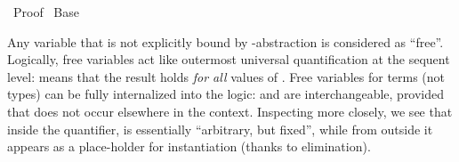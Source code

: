 %
\begin{isabellebody}%
\def\isabellecontext{Proof}%
%
\isadelimtheory
%
\endisadelimtheory
%
\isatagtheory
{}\isamarkupfalse%
\ Proof\isanewline
{}\ Base\isanewline
{}%
\endisatagtheory
{\isafoldtheory}%
%
\isadelimtheory
%
\endisadelimtheory
%
\isamarkuptrue%
%
\isamarkuptrue%
%
\begin{isamarkuptext}%
Any variable that is not explicitly bound by -abstraction
  is considered as ``free''.  Logically, free variables act like
  outermost universal quantification at the sequent level:  means that the result
  holds \emph{for all} values of .  Free variables for
  terms (not types) can be fully internalized into the logic:  and  are interchangeable, provided
  that  does not occur elsewhere in the context.
  Inspecting  more closely, we see that inside the
  quantifier,  is essentially ``arbitrary, but fixed'',
  while from outside it appears as a place-holder for instantiation
  (thanks to  elimination).


\end{isamarkuptext}
\end{isabellebody}
